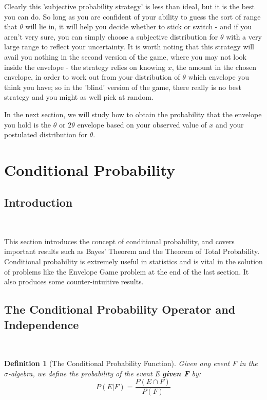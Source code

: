 \documentclass[12pt,a4paper]{article}
\newtheorem{defn}[thm]{Definition}
\begin{document}
Clearly this 'subjective probability strategy' is less than ideal, but it is the best you can do. So long as you are confident of your ability to guess the sort of range that $\theta$ will lie in, it will help you decide whether to stick or switch - and if you aren't very sure, you can simply choose a subjective distribution for $\theta$ with a very large range to reflect your uncertainty. It is worth noting that this strategy will avail you nothing in the second version of the game, where you may not look inside the envelope - the strategy relies on knowing $x$, the amount in the chosen envelope, in order to work out from your distribution of $\theta$ which envelope you think you have; so in the 'blind' version of the game, there really is no best strategy and you might as well pick at random.

In the next section, we will study how to obtain the probability that the envelope you hold is the $\theta$ or $2\theta$ envelope based on your observed value of $x$ and your postulated distribution for $\theta$.

\clearpage
\section{Conditional Probability}

\subsection{Introduction}$\;$

This section introduces the concept of conditional probability, and covers important results such as Bayes' Theorem and the Theorem of Total Probability. Conditional probability is extremely useful in statistics and is vital in the solution of problems like the Envelope Game problem at the end of the last section. It also produces some counter-intuitive results.

\subsection{The Conditional Probability Operator and Independence}\label{conditional and independence}$\;$
\begin{defn}[The Conditional Probability Function]

Given any event F in the $\sigma$-algebra, we define the probability of the event E {\bf given F} by:
$$P(E|F) = \frac{P(E \cap F)}{P(F)}$$
\end{defn}
\end{document}
